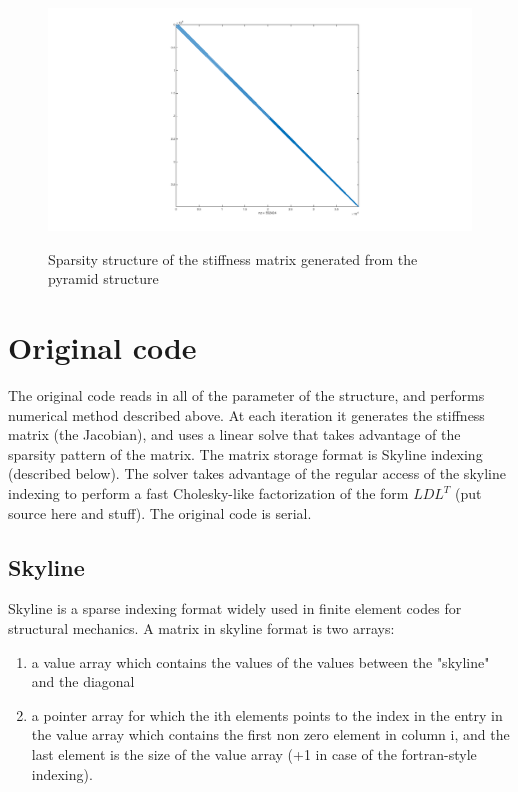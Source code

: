 \documentclass[11pt]{article}
\begin{document}
\begin{figure}[H]
\begin{center}
\caption{Sparsity structure of the stiffness matrix generated from the pyramid structure}
\includegraphics[width=20cm]{pyramid-sparsity.png}
\label{fig:pyramid-sparsity}
\\
\end{center}

\end{figure}

\section{Original code}
The original code reads in all of the parameter of the structure, and performs numerical method described above. At each iteration it generates the stiffness matrix (the Jacobian), and uses a linear solve that takes advantage of the sparsity pattern of the matrix. The matrix storage format is Skyline indexing (described below). The solver takes advantage of the regular access of the skyline indexing to perform a fast Cholesky-like factorization of the form $LDL^T$ (put source here and stuff). The original code is serial.


\subsection{Skyline}
Skyline is a sparse indexing format widely used in finite element codes for structural mechanics. A matrix in skyline format is two arrays: 
\begin{enumerate}

\item a value array which contains the values of the values between the "skyline" and the diagonal
\item a  pointer array for which the ith elements points to the index in the entry in the value array which contains the first non zero element in column i, and the last element is the size of the value array (+1 in case of the fortran-style indexing).

\end{enumerate}
\end{document}
